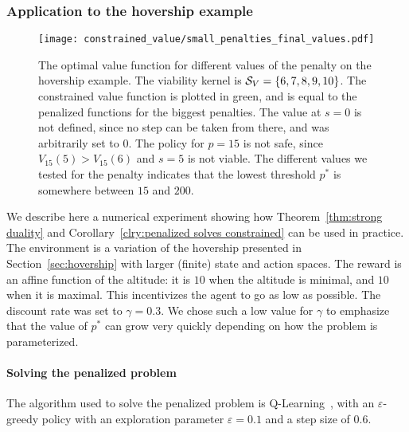 \subsubsection{Application to the hovership example} \label{sec:hovership example}

\begin{figure}[t]
	\centering
	\texttt{[image: constrained\_value/small\_penalties\_final\_values.pdf]}
	\caption[Penalized optimal value function]{The optimal value function for different values of the penalty on the hovership example. The viability kernel is ${\mathcal{S}_{V}}=\{6, 7, 8, 9, 10\}$. The constrained value function is plotted in green, and is equal to the penalized functions for the biggest penalties. The value at $s=0$ is not defined, since no step can be taken from there, and was arbitrarily set to $0$. The policy for $p=15$ is not safe, since $V_{15}(5) > V_{15}(6)$ and $s=5$ is not viable. The different values we tested for the penalty indicates that the lowest threshold $p^*$ is somewhere between $15$ and $200$.}
	\label{fig:hovership values comparison}
\end{figure}
We describe here a numerical experiment showing how Theorem~\ref{thm:strong duality} and Corollary~\ref{clry:penalized solves constrained} can be used in practice. The environment is a variation of the hovership presented in Section~\ref{sec:hovership} with larger (finite) state and action spaces. The reward is an affine function of the altitude: it is $10$ when the altitude is minimal, and $10$ when it is maximal. This incentivizes the agent to go as low as possible. The discount rate was set to $\gamma = 0.3$. We chose such a low value for $\gamma$ to emphasize that the value of $p^*$ can grow very quickly depending on how the problem is parameterized.

\paragraph{Solving the penalized problem} The algorithm used to solve the penalized problem is Q-Learning~\cite{watkins1992q}, with an $\varepsilon$-greedy policy with an exploration parameter $\varepsilon = 0.1$ and a step size of $0.6$.

